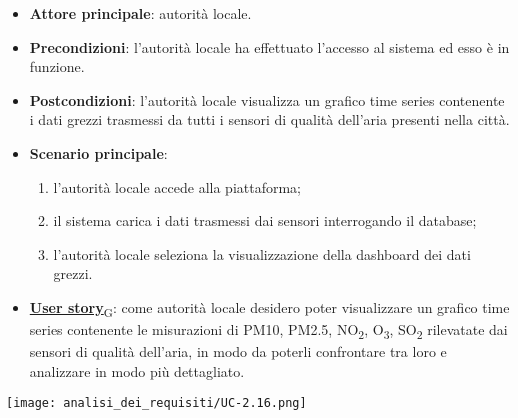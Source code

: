 \begin{itemize}
	\item \textbf{Attore principale}: autorità locale.
	\item \textbf{Precondizioni}: l'autorità locale ha effettuato l'accesso al sistema ed esso è in funzione.
	\item \textbf{Postcondizioni}: l'autorità locale visualizza un grafico time series contenente i dati grezzi trasmessi da tutti i sensori
	      di qualità dell'aria presenti nella città.
	\item \textbf{Scenario principale}:
	      \begin{enumerate}
		      \item l'autorità locale accede alla piattaforma;
		      \item il sistema carica i dati trasmessi dai sensori interrogando il database;
		      \item l'autorità locale seleziona la visualizzazione della dashboard dei dati grezzi.
	      \end{enumerate}
	\item \href{https://7last.github.io/docs/rtb/documentazione-interna/glossario\#user-story}{\textbf{User story}\textsubscript{G}}:
	      come autorità locale desidero poter visualizzare un grafico time series contenente le misurazioni di PM10, PM2.5, NO\textsubscript{2}, O\textsubscript{3}, SO\textsubscript{2}
	      rilevatate dai sensori di qualità dell'aria, in modo da poterli confrontare tra loro e analizzare in modo più dettagliato.
\end{itemize}
\begin{center}
	\texttt{[image: analisi\_dei\_requisiti/UC-2.16.png]}
\end{center}


